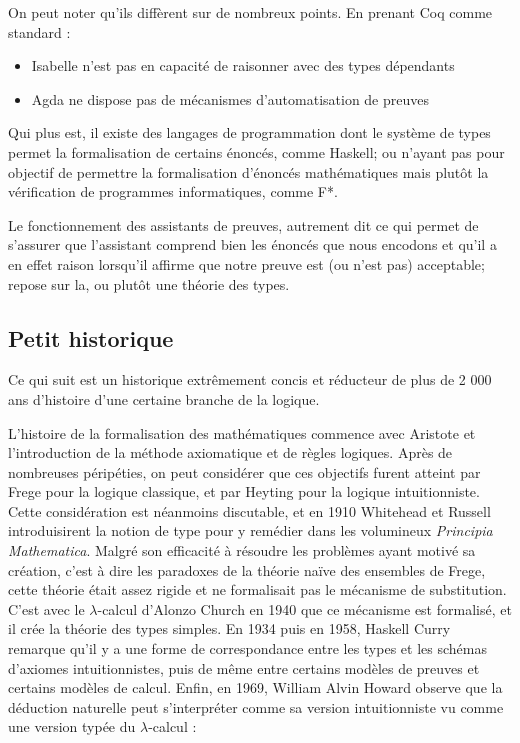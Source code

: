 \documentclass[a4paper, 12pt]{article}
\begin{document}
On peut noter qu'ils diffèrent sur de nombreux points. En prenant Coq comme standard :

\begin{itemize}
    \item Isabelle n'est pas en capacité de raisonner avec des types dépendants
    \item Agda ne dispose pas de mécanismes d'automatisation de preuves
\end{itemize}

Qui plus est, il existe des langages de programmation dont le système de types permet la formalisation de certains énoncés, comme Haskell; ou n'ayant pas pour objectif de permettre la formalisation d'énoncés mathématiques mais plutôt la vérification de programmes informatiques, comme F*.

Le fonctionnement des assistants de preuves, autrement dit ce qui permet de s'assurer que l'assistant comprend bien les énoncés que nous encodons et qu'il a en effet raison lorsqu'il affirme que notre preuve est (ou n'est pas) acceptable; repose sur la, ou plutôt une théorie des types.

\subsection{Petit historique}

Ce qui suit est un historique extrêmement concis et réducteur de plus de 2 000 ans d'histoire d'une certaine branche de la logique.

L'histoire de la formalisation des mathématiques commence avec Aristote et l'introduction de la méthode axiomatique et de règles logiques. Après de nombreuses péripéties, on peut considérer que ces objectifs furent atteint par Frege pour la logique classique, et par Heyting pour la logique intuitionniste. Cette considération est néanmoins discutable, et en 1910 Whitehead et Russell introduisirent la notion de type pour y remédier dans les volumineux \textit{Principia Mathematica}. Malgré son efficacité à résoudre les problèmes ayant motivé sa création, c'est à dire les paradoxes de la théorie naïve des ensembles de Frege, cette théorie était assez rigide et ne formalisait pas le mécanisme de substitution. C'est avec le $\lambda$-calcul d'Alonzo Church en 1940 que ce mécanisme est formalisé, et il crée la théorie des types simples. En 1934 puis en 1958, Haskell Curry remarque qu'il y a une forme de correspondance entre les types et les schémas d'axiomes intuitionnistes, puis de même entre certains modèles de preuves et certains modèles de calcul. Enfin, en 1969, William Alvin Howard observe que la déduction naturelle peut s'interpréter comme sa version intuitionniste vu comme une version typée du $\lambda$-calcul :
\end{document}
